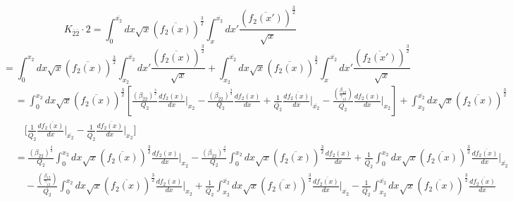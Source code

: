 \documentclass[fleqn, 10pt]{article}
\begin{document}
\begin{equation}
    K_{\overline{2} \overline{2}} \cdot 2 = \int^{\overline{x_{2}}}_{0} dx \sqrt{x} (\overline{f_{2}(x)})^\frac{3}{2} \int^{\overline{x_{2}}}_{x} dx' \frac{(\overline{f_{2}(x')})^\frac{3}{2}}{\sqrt{x}} 
\end{equation}
\begin{equation*}
    = \int^{x_{2}}_{0} dx \sqrt{x} (\overline{f_{2}(x)})^\frac{3}{2} \int^{\overline{x_{2}}}_{x_{2}} dx' \frac{(\overline{f_{2}(x)})^\frac{3}{2}}{\sqrt{x}} + \int^{\overline{x_{2}}}_{x_{2}} dx \sqrt{x} (\overline{f_{2}(x)})^\frac{3}{2} \int^{\overline{x_{2}}}_{x} dx' \frac{(\overline{f_{2}(x')})^\frac{3}{2}}{\sqrt{x}}
\end{equation*}
\begin{equation*}
\begin{split}
    & = \int^{x_{2}}_{0}dx\sqrt{x}(\overline{f_{2}(x)})^\frac{3}{2}\left[ \frac{(\beta_{\overline{2}2})^\frac{3}{2}}{Q_{2}} \frac{df_{2}(x)}{dx} \Bigg|_{x_{2}} - \frac{(\beta_{\overline{2}2})^\frac{3}{2}}{Q_{2}} \frac{df_{2}(x)}{dx} + \frac{1}{\overline{Q_{2}}}   \frac{d\overline{f_{2}(x)}}{dx} \Bigg|_{\overline{x_{2}}} - \frac{\left( \frac{\beta_{12}}{\gamma_{1\overline{2}}}\right)}{\overline{Q_{2}}}   \frac{df_{2}(x)}{dx} \Bigg|_{x_{2}} \right] + \int^{\overline{x_{2}}}_{x_{2}} dx \sqrt{x} (\overline{f_{2}(x)})^\frac{3}{2} \\ & \quad \biggl[ \frac{1}{\overline{Q_{2}}}   \frac{d\overline{f_{2}(x)}}{dx} \Bigg|_{\overline{x_{2}}} - \frac{1}{\overline{Q_{2}}}   \frac{d\overline{f_{2}(x)}}{dx} \Bigg|_{x_{2}} \biggr]
    \end{split}
\end{equation*}
\begin{equation*}
\begin{split}
    &= \frac{(\beta_{\overline{2}2})^\frac{3}{2}}{Q_{2}} \int^{x_{2}}_{0} dx \sqrt{x} (\overline{f_{2}(x)})^\frac{3}{2}  \frac{df_{2}(x)}{dx} \Bigg|_{x_{2}} - \frac{(\beta_{\overline{2}2})^\frac{3}{2}}{Q_{2}} \int^{x_{2}}_{0} dx \sqrt{x} (\overline{f_{2}(x)})^\frac{3}{2} \frac{df_{2}(x)}{dx} + \frac{1}{\overline{Q_{2}}} \int^{x_{2}}_{0} dx \sqrt{x} (\overline{f_{2}(x)})^\frac{3}{2}   \frac{d\overline{f_{2}(x)}}{dx} \Bigg|_{\overline{x_{2}}} \\ & \quad - \frac{\left( \frac{\beta_{12}}{\gamma_{1\overline{2}}}\right)}{\overline{Q_{2}}} \int^{x_{2}}_{0} dx \sqrt{x} (\overline{f_{2}(x)})^\frac{3}{2}   \frac{df_{2}(x)}{dx} \Bigg|_{x_{2}} + \frac{1}{\overline{Q_{2}}} \int^{\overline{x_{2}}}_{x_{2}} dx \sqrt{x} (\overline{f_{2}(x)})^\frac{3}{2}   \frac{d\overline{f_{2}(x)}}{dx} \Bigg|_{\overline{x_{2}}} - \frac{1}{\overline{Q_{2}}} \int^{\overline{x_{2}}}_{x_{2}} dx \sqrt{x} (\overline{f_{2}(x)})^\frac{3}{2} \frac{d\overline{f_{2}(x)}}{dx}
    \end{split}
\end{equation*}
\end{document}
